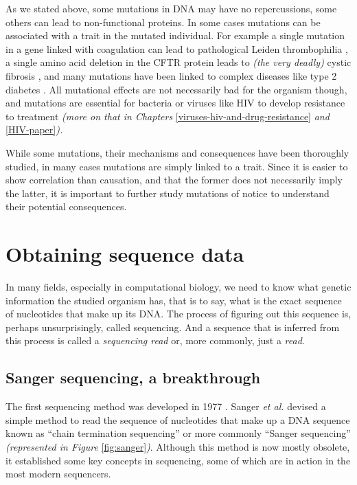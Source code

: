 \documentclass[
  11pt,
  twoside]{scrbook}
\begin{document}
As we stated above, some mutations in DNA may have no repercussions, some others can lead to non-functional proteins. In some cases mutations can be associated with a trait in the mutated individual. For example a single mutation in a gene linked with coagulation can lead to pathological Leiden thrombophilia \autocite{kujovichFactorLeidenThrombophilia2011}, a single amino acid deletion in the CFTR protein leads to \emph{(the very deadly)} cystic fibrosis \autocite{cuttingCysticFibrosisGenetics2015}, and many mutations have been linked to complex diseases like type 2 diabetes \autocite{fuchsbergerGeneticArchitectureType2016,morrisLargescaleAssociationAnalysis2012}. All mutational effects are not necessarily bad for the organism though, and mutations are essential for bacteria \autocite{woodfordEmergenceAntibioticResistance2007} or viruses like HIV \autocite{rheeHumanImmunodeficiencyVirus2003} to develop resistance to treatment \emph{(more on that in Chapters} \ref{viruses-hiv-and-drug-resistance} \emph{and} \ref{HIV-paper}\emph{).}

While some mutations, their mechanisms and consequences have been thoroughly studied, in many cases mutations are simply linked to a trait. Since it is easier to show correlation than causation, and that the former does not necessarily imply the latter, it is important to further study mutations of notice to understand their potential consequences.

\hypertarget{obtaining-sequence-data}{%
\section{Obtaining sequence data}\label{obtaining-sequence-data}}

In many fields, especially in computational biology, we need to know what genetic information the studied organism has, that is to say, what is the exact sequence of nucleotides that make up its DNA. The process of figuring out this sequence is, perhaps unsurprisingly, called sequencing. And a sequence that is inferred from this process is called a \emph{sequencing read} or, more commonly, just a \emph{read}.

\hypertarget{sanger-sequencing-a-breakthrough}{%
\subsection{Sanger sequencing, a breakthrough}\label{sanger-sequencing-a-breakthrough}}

The first sequencing method was developed in 1977 \autocite{sangerDNASequencingChainterminating1977}. Sanger \emph{et al.} devised a simple method to read the sequence of nucleotides that make up a DNA sequence known as ``chain termination sequencing'' or more commonly ``Sanger sequencing'' \emph{(represented in Figure} \ref{fig:sanger}\emph{)}. Although this method is now mostly obsolete, it established some key concepts in sequencing, some of which are in action in the most modern sequencers.
\end{document}
